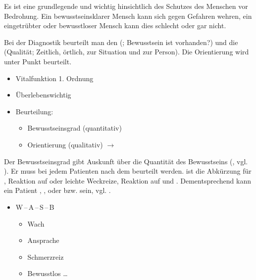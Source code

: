 \TextSlide{\TxBeschreibung}
{
Es ist eine grundlegende
 und wichtig
hinsichtlich des Schutzes des Menschen vor Bedrohung. Ein bewusstseinsklarer
Mensch kann sich gegen Gefahren wehren, ein eingetrübter
oder bewusstloser Mensch kann dies schlecht oder gar nicht. 

Bei der Diagnostik beurteilt man 
den  (;
 Bewusstsein ist vorhanden?) und
die  (Qualität;  Zeitlich, örtlich, zur Situation und zur
Person). Die Orientierung wird unter
Punkt  beurteilt.
}{
\begin{itemize}
  \item Vitalfunktion 1. Ordnung
  \item Überlebenswichtig
  \item Beurteilung:
  \begin{itemize}
    \item Bewusstseinsgrad (quantitativ)
    \item Orientierung (qualitativ) $\rightarrow$ 
  \end{itemize}
\end{itemize}
}{}{}{}



{%
\label{topic:bewusstseinsstoerung-grade-advanced}
\label{topic:bewusstseinsgrad-advanced}
%
Der Bewusstseinsgrad gibt Auskunft über die Quantität des
Bewusstseins (, vgl.
). 
Er muss bei jedem Patienten nach dem
 beurteilt
werden. 
%
 ist die Abkürzung für 
,
Reaktion auf  oder
  leichte Weckreize,
Reaktion auf  und
. 
%
Dementsprechend kann ein Patient
, , 
oder   bzw.  sein, vgl.
.
}{
\begin{itemize}
  \item W\,--\,A\,--\,S\,--\,B
  \begin{itemize}
    \item Wach \dotfill  {}
    \item Ansprache \dotfill 
    \item Schmerzreiz \dotfill  {}
    \item Bewusstlos \ldots  {}
  \end{itemize}
\end{itemize}
}{}{}{}


